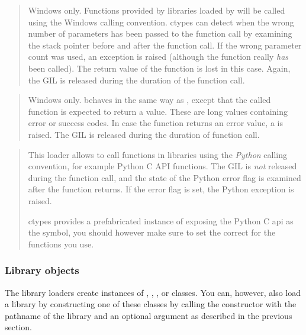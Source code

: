 \begin{quote}

Windows only.  Functions provided by libraries loaded by
 will be called using the Windows  calling
convention.  ctypes can detect when the wrong number
of parameters has been passed to the function call by examining
the stack pointer before and after the function call.  If the
wrong parameter count was used, an exception is raised (although
the function really \emph{has} been called).  The return value of the
function is lost in this case.  Again, the GIL is released during
the duration of the function call.
\end{quote}

\begin{quote}

Windows only.   behaves in the same way as ,
except that the called function is expected to return a
 value.  These are long values containing error or
success codes.  In case the function returns an error 
value, a  is raised.  The GIL is released during the
duration of function call.
\end{quote}

\begin{quote}

This loader allows to call functions in libraries using the
\emph{Python} calling convention, for example Python C API functions.
The GIL is \emph{not} released during the function call, and the state
of the Python error flag is examined after the function returns.
If the error flag is set, the Python exception is raised.

ctypes provides a prefabricated instance of  exposing the
Python C api as the  symbol, you should however make
sure to set the correct  for the functions you use.
\end{quote}


\subsubsection{Library objects\label{ctypes-library-objects}}

The library loaders create instances of , ,
, or  classes.  You can, however, also load a
library by constructing one of these classes by calling the
constructor with the pathname of the library and an optional 
argument as described in the previous section.

